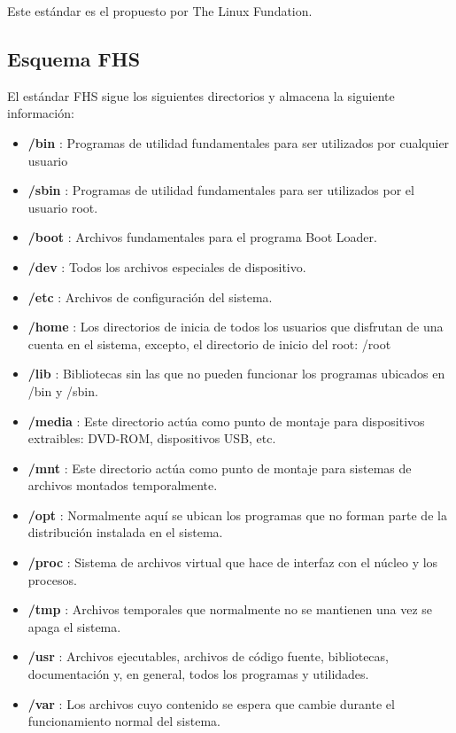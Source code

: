 \documentclass[12pt, spanish]{article}
\begin{document}
Este estándar es el propuesto por The Linux Fundation.

\subsection{Esquema FHS}
El estándar FHS sigue los siguientes directorios y almacena la siguiente información:

\begin{itemize}
	\item{\textbf{/bin} : Programas de utilidad fundamentales para ser utilizados por cualquier usuario}
	\item{\textbf{/sbin} : Programas de utilidad fundamentales para ser utilizados por el usuario root.}
	\item{\textbf{/boot} : Archivos fundamentales para el programa Boot Loader.}
	\item{\textbf{/dev} : Todos los archivos especiales de dispositivo.}
	\item{\textbf{/etc} : Archivos de configuración del sistema.}
	\item{\textbf{/home} : Los directorios de inicia de todos los usuarios que disfrutan de una cuenta en el sistema, excepto, el directorio de inicio del root: /root}
	\item{\textbf{/lib} : Bibliotecas sin las que no pueden funcionar los programas ubicados en /bin y /sbin.}
	\item{\textbf{/media} : Este directorio actúa como punto de montaje para dispositivos extraibles: DVD-ROM, dispositivos USB, etc.}
	\item{\textbf{/mnt} : Este directorio actúa como punto de montaje para sistemas de archivos montados temporalmente.}
	\item{\textbf{/opt} : Normalmente aquí se ubican los programas que no forman parte de la distribución instalada en el sistema.}
	\item{\textbf{/proc} : Sistema de archivos virtual que hace de interfaz con el núcleo y los procesos.}
	\item{\textbf{/tmp} : Archivos temporales que normalmente no se mantienen una vez se apaga el sistema.}
	\item{\textbf{/usr} : Archivos ejecutables, archivos de código fuente, bibliotecas, documentación y, en general, todos los programas y utilidades.}
	\item{\textbf{/var} : Los archivos cuyo contenido se espera que cambie durante el funcionamiento normal del sistema.}
\end{itemize}
\end{document}
